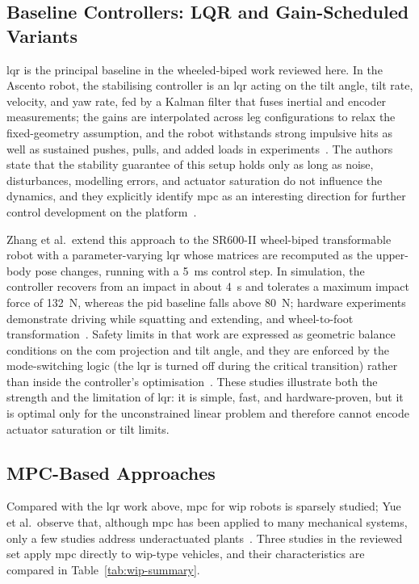 \subsection{Baseline Controllers: LQR and Gain-Scheduled Variants}\label{sec:bg-wip-lqr}

\ac{lqr} is the principal baseline in the wheeled-biped work reviewed here. In the Ascento robot, the stabilising controller is an \ac{lqr} acting on the tilt angle, tilt rate, velocity, and yaw rate, fed by a Kalman filter that fuses inertial and encoder measurements; the gains are interpolated across leg configurations to relax the fixed-geometry assumption, and the robot withstands strong impulsive hits as well as sustained pushes, pulls, and added loads in experiments~\cite{klemm2019}. The authors state that the stability guarantee of this setup holds only as long as noise, disturbances, modelling errors, and actuator saturation do not influence the dynamics, and they explicitly identify \ac{mpc} as an interesting direction for further control development on the platform~\cite{klemm2019}.

Zhang et al.\ extend this approach to the SR600-II wheel-biped transformable robot with a parameter-varying \ac{lqr} whose matrices are recomputed as the upper-body pose changes, running with a 5~ms control step. In simulation, the controller recovers from an impact in about 4~s and tolerates a maximum impact force of 132~N, whereas the \ac{pid} baseline falls above 80~N; hardware experiments demonstrate driving while squatting and extending, and wheel-to-foot transformation~\cite{zhang2022}. Safety limits in that work are expressed as geometric balance conditions on the \ac{com} projection and tilt angle, and they are enforced by the mode-switching logic (the \ac{lqr} is turned off during the critical transition) rather than inside the controller's optimisation~\cite{zhang2022}. These studies illustrate both the strength and the limitation of \ac{lqr}: it is simple, fast, and hardware-proven, but it is optimal only for the unconstrained linear problem and therefore cannot encode actuator saturation or tilt limits.

\subsection{MPC-Based Approaches}\label{sec:bg-wip-mpc}

Compared with the \ac{lqr} work above, \ac{mpc} for \ac{wip} robots is sparsely studied; Yue et al.\ observe that, although \ac{mpc} has been applied to many mechanical systems, only a few studies address underactuated plants~\cite{yue2018tsmc}. Three studies in the reviewed set apply \ac{mpc} directly to \ac{wip}-type vehicles, and their characteristics are compared in Table~\ref{tab:wip-summary}.

